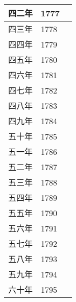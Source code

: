 \begin{longtable}{|>{\centering\scriptsize}m{2em}|>{\centering\scriptsize}m{1.3em}|>{\centering}m{8.8em}|}
  四二年 & 1777 & \tabularnewline\hline
  四三年 & 1778 & \tabularnewline\hline
  四四年 & 1779 & \tabularnewline\hline
  四五年 & 1780 & \tabularnewline\hline
  四六年 & 1781 & \tabularnewline\hline
  四七年 & 1782 & \tabularnewline\hline
  四八年 & 1783 & \tabularnewline\hline
  四九年 & 1784 & \tabularnewline\hline
  五十年 & 1785 & \tabularnewline\hline
  五一年 & 1786 & \tabularnewline\hline
  五二年 & 1787 & \tabularnewline\hline
  五三年 & 1788 & \tabularnewline\hline
  五四年 & 1789 & \tabularnewline\hline
  五五年 & 1790 & \tabularnewline\hline
  五六年 & 1791 & \tabularnewline\hline
  五七年 & 1792 & \tabularnewline\hline
  五八年 & 1793 & \tabularnewline\hline
  五九年 & 1794 & \tabularnewline\hline
  六十年 & 1795 & \tabularnewline
  \bottomrule
\end{longtable}


